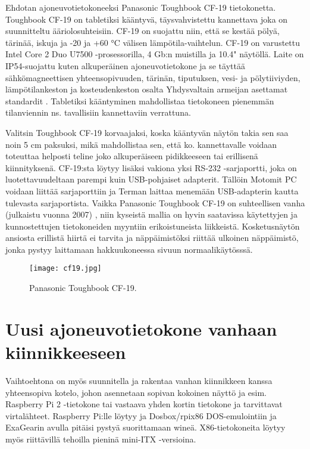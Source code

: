 Ehdotan ajoneuvotietokoneeksi Panasonic Toughbook CF-19 tietokonetta. Toughbook CF-19 on tabletiksi kääntyvä, täysvahvistettu kannettava joka on suunnitteltu ääriolosuhteisiin. CF-19 on suojattu niin, että se kestää pölyä, tärinää, iskuja ja -20 ja +60 °C välisen lämpötila-vaihtelun. CF-19 on varustettu Intel Core 2 Duo U7500 -prosessorilla, 4 Gb:n muistilla ja 10.4" näytöllä. Laite on IP54-suojattu kuten alkuperäinen ajoneuvotietokone ja se täyttää sähkömagneettisen yhteensopivuuden, tärinän, tiputuksen, vesi- ja pölytiiviyden, lämpötilankeston ja kosteudenkeston osalta Yhdysvaltain armeijan asettamat standardit \cite{cf19}. Tabletiksi kääntyminen mahdollistaa tietokoneen pienemmän tilanviennin ns. tavallisiin kannettaviin verrattuna.

Valitsin Toughbook CF-19 korvaajaksi, koska kääntyvän näytön takia sen saa noin 5 cm paksuksi, mikä mahdollistaa sen, että ko. kannettavalle voidaan toteuttaa helposti teline joko alkuperäiseen pidikkeeseen tai erillisenä kiinnityksenä. CF-19:sta löytyy lisäksi vakiona yksi RS-232 -sarjaportti, joka on luotettavuudeltaan parempi kuin USB-pohjaiset adapterit. Tällöin Motomit PC voidaan liittää sarjaporttiin ja Terman laittaa menemään USB-adapterin kautta tulevasta sarjaportista. Vaikka Panasonic Toughbook CF-19 on suhteellisen vanha (julkaistu vuonna 2007) \cite{cf19}, niin kyseistä mallia on hyvin saatavissa käytettyjen ja kunnostettujen tietokoneiden myyntiin erikoistuneista liikkeistä. Kosketusnäytön ansiosta erillistä hiirtä ei tarvita ja näppäimistöksi riittää ulkoinen näppäimistö, jonka pystyy laittamaan hakkuukoneessa sivuun normaalikäytösssä.

\begin{figure}[H]
\centering
\texttt{[image: cf19.jpg]}
\caption{Panasonic Toughbook CF-19.}
\end{figure}

\section{Uusi ajoneuvotietokone vanhaan kiinnikkeeseen}

Vaihtoehtona on myös suunnitella ja rakentaa vanhan kiinnikkeen kanssa yhteensopiva kotelo, johon asennetaan sopivan kokoinen näyttö ja esim. Raspberry Pi 2 -tietokone tai vastaava yhden kortin tietokone ja tarvittavat virtalähteet. Raspberry Pi:lle löytyy ja Dosbox/rpix86 DOS-emulointiin ja ExaGearin avulla pitäisi pystyä suorittamaan wineä. X86-tietokoneita löytyy myös riittävillä tehoilla pieninä mini-ITX -versioina.

